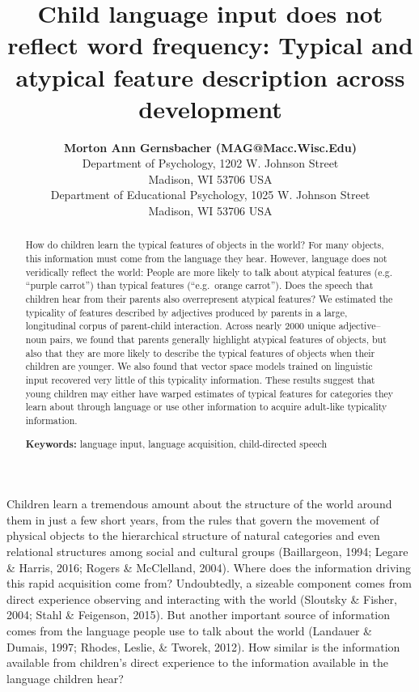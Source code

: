 \documentclass[10pt, letterpaper]{article}
\title{Child language input does not reflect word frequency: Typical and
atypical feature description across development}
\author{{\large \bf Morton Ann Gernsbacher (MAG@Macc.Wisc.Edu)} \\ Department of Psychology, 1202 W. Johnson Street \\ Madison, WI 53706 USA \AND {\large \bf Sharon J.~Derry (SDJ@Macc.Wisc.Edu)} \\ Department of Educational Psychology, 1025 W. Johnson Street \\ Madison, WI 53706 USA}
\begin{document}
\maketitle

\begin{abstract}
How do children learn the typical features of objects in the world? For
many objects, this information must come from the language they hear.
However, language does not veridically reflect the world: People are
more likely to talk about atypical features (e.g. ``purple carrot'')
than typical features (``e.g.~orange carrot''). Does the speech that
children hear from their parents also overrepresent atypical features?
We estimated the typicality of features described by adjectives produced
by parents in a large, longitudinal corpus of parent-child interaction.
Across nearly 2000 unique adjective--noun pairs, we found that parents
generally highlight atypical features of objects, but also that they are
more likely to describe the typical features of objects when their
children are younger. We also found that vector space models trained on
linguistic input recovered very little of this typicality information.
These results suggest that young children may either have warped
estimates of typical features for categories they learn about through
language or use other information to acquire adult-like typicality
information.

\textbf{Keywords:}
language input, language acquisition, child-directed speech
\end{abstract}

Children learn a tremendous amount about the structure of the world
around them in just a few short years, from the rules that govern the
movement of physical objects to the hierarchical structure of natural
categories and even relational structures among social and cultural
groups (Baillargeon, 1994; Legare \& Harris, 2016; Rogers \& McClelland,
2004). Where does the information driving this rapid acquisition come
from? Undoubtedly, a sizeable component comes from direct experience
observing and interacting with the world (Sloutsky \& Fisher, 2004;
Stahl \& Feigenson, 2015). But another important source of information
comes from the language people use to talk about the world (Landauer \&
Dumais, 1997; Rhodes, Leslie, \& Tworek, 2012). How similar is the
information available from children's direct experience to the
information available in the language children hear?
\end{document}

